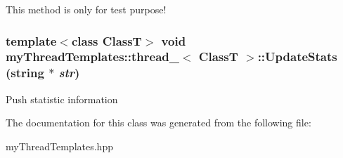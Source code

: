 This method is only for test purpose! 

\hypertarget{classmyThreadTemplates_1_1thread__1_a2cd2286a9d51537395123832a6a25ebc}{
\subsubsection[{UpdateStats}]{\setlength{\rightskip}{0pt plus 5cm}template$<$class ClassT$>$ void {\bf myThreadTemplates::thread\_}$<$ ClassT $>$::UpdateStats (string $\ast$ {\em str})}}
\label{classmyThreadTemplates_1_1thread__1_a2cd2286a9d51537395123832a6a25ebc}


Push statistic information 



The documentation for this class was generated from the following file:\begin{DoxyCompactItemize}
\item 
myThreadTemplates.hpp\end{DoxyCompactItemize}
